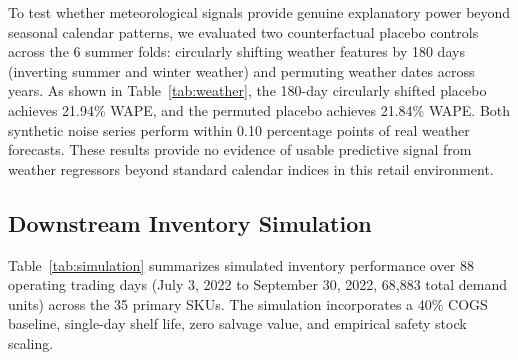 \documentclass[conference]{IEEEtran}
\begin{document}
\begin{table}[!t]
\centering
\caption{Weather Feature Placebo and Permutation Test Results (6 Summer Folds)}
\label{tab:weather}
\end{table}

To test whether meteorological signals provide genuine explanatory power beyond seasonal calendar patterns, we evaluated two counterfactual placebo controls across the 6 summer folds: circularly shifting weather features by 180 days (inverting summer and winter weather) and permuting weather dates across years. As shown in Table~\ref{tab:weather}, the 180-day circularly shifted placebo achieves 21.94\% WAPE, and the permuted placebo achieves 21.84\% WAPE. Both synthetic noise series perform within 0.10 percentage points of real weather forecasts. These results provide no evidence of usable predictive signal from weather regressors beyond standard calendar indices in this retail environment.

\subsection{Downstream Inventory Simulation}
Table~\ref{tab:simulation} summarizes simulated inventory performance over 88 operating trading days (July 3, 2022 to September 30, 2022, 68,883 total demand units) across the 35 primary SKUs. The simulation incorporates a 40\% COGS baseline, single-day shelf life, zero salvage value, and empirical safety stock scaling.
\end{document}
